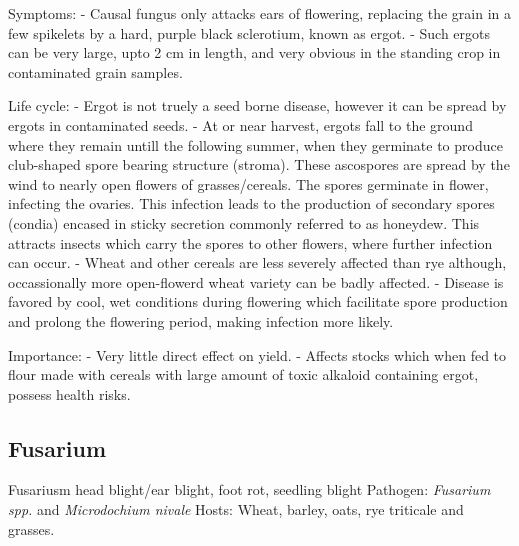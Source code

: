 \documentclass[]{book}
\begin{document}
Symptoms:
- Causal fungus only attacks ears of flowering, replacing the grain in a few spikelets by a hard, purple black sclerotium, known as ergot.
- Such ergots can be very large, upto 2 cm in length, and very obvious in the standing crop in contaminated grain samples.

Life cycle:
- Ergot is not truely a seed borne disease, however it can be spread by ergots in contaminated seeds.
- At or near harvest, ergots fall to the ground where they remain untill the following summer, when they germinate to produce club-shaped spore bearing structure (stroma). These ascospores are spread by the wind to nearly open flowers of grasses/cereals. The spores germinate in flower, infecting the ovaries. This infection leads to the production of secondary spores (condia) encased in sticky secretion commonly referred to as honeydew. This attracts insects which carry the spores to other flowers, where further infection can occur.
- Wheat and other cereals are less severely affected than rye although, occassionally more open-flowerd wheat variety can be badly affected.
- Disease is favored by cool, wet conditions during flowering which facilitate spore production and prolong the flowering period, making infection more likely.

Importance:
- Very little direct effect on yield.
- Affects stocks which when fed to flour made with cereals with large amount of toxic alkaloid containing ergot, possess health risks.

\hypertarget{fusarium}{%
\subsection{Fusarium}\label{fusarium}}

Fusariusm head blight/ear blight, foot rot, seedling blight
Pathogen: \emph{Fusarium spp.} and \emph{Microdochium nivale}
Hosts: Wheat, barley, oats, rye triticale and grasses.
\end{document}
